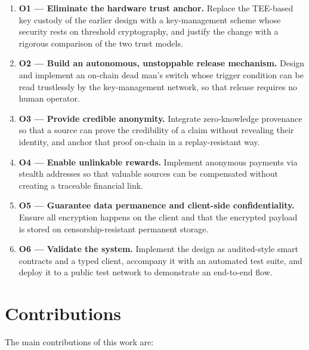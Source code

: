 \begin{enumerate}
  \item \textbf{O1 --- Eliminate the hardware trust anchor.} Replace the
  TEE-based key custody of the earlier design with a key-management scheme whose
  security rests on threshold cryptography, and justify the change with a
  rigorous comparison of the two trust models.

  \item \textbf{O2 --- Build an autonomous, unstoppable release mechanism.}
  Design and implement an on-chain dead man's switch whose trigger condition can
  be read trustlessly by the key-management network, so that release requires no
  human operator.

  \item \textbf{O3 --- Provide credible anonymity.} Integrate zero-knowledge
  provenance so that a source can prove the credibility of a claim without
  revealing their identity, and anchor that proof on-chain in a replay-resistant
  way.

  \item \textbf{O4 --- Enable unlinkable rewards.} Implement anonymous payments
  via stealth addresses so that valuable sources can be compensated without
  creating a traceable financial link.

  \item \textbf{O5 --- Guarantee data permanence and client-side
  confidentiality.} Ensure all encryption happens on the client and that the
  encrypted payload is stored on censorship-resistant permanent storage.

  \item \textbf{O6 --- Validate the system.} Implement the design as audited-style
  smart contracts and a typed client, accompany it with an automated test suite,
  and deploy it to a public test network to demonstrate an end-to-end flow.
\end{enumerate}

\section{Contributions}
\label{sec:intro-contributions}

The main contributions of this work are:

